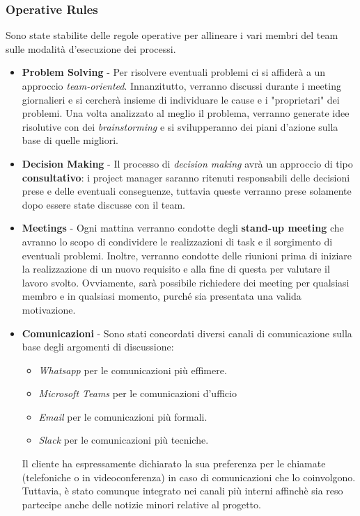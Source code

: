 \subsubsection{Operative Rules}
\label{sec:planning-operative-rules}
Sono state stabilite delle regole operative per allineare i vari membri del team sulle modalità d'esecuzione dei processi.
\begin{itemize}
    \item \textbf{Problem Solving} - Per risolvere eventuali problemi ci si affiderà a un approccio \textit{team-oriented}. Innanzitutto, verranno discussi durante i meeting giornalieri e si cercherà insieme di individuare le cause e i "proprietari" dei problemi. Una volta analizzato al meglio il problema, verranno generate idee risolutive con dei \textit{brainstorming} e si svilupperanno dei piani d'azione sulla base di quelle migliori.
    \item \textbf{Decision Making} - Il processo di \textit{decision making} avrà un approccio di tipo \textbf{consultativo}: i project manager saranno ritenuti responsabili delle decisioni prese e delle eventuali conseguenze, tuttavia queste verranno prese solamente dopo essere state discusse con il team.
    \item \textbf{Meetings} - Ogni mattina verranno condotte degli \textbf{stand-up meeting} che avranno lo scopo di condividere le realizzazioni di task e il sorgimento di eventuali problemi. Inoltre, verranno condotte delle riunioni prima di iniziare la realizzazione di un nuovo requisito e alla fine di questa per valutare il lavoro svolto. Ovviamente, sarà possibile richiedere dei meeting per qualsiasi membro e in qualsiasi momento, purché sia presentata una valida motivazione.
    \item \textbf{Comunicazioni} - Sono stati concordati diversi canali di comunicazione sulla base degli argomenti di discussione:
    \begin{itemize}
        \item \textit{Whatsapp} per le comunicazioni più effimere.
        \item \textit{Microsoft Teams} per le comunicazioni d'ufficio
        \item \textit{Email} per le comunicazioni più formali.
        \item \textit{Slack} per le comunicazioni più tecniche.
    \end{itemize}
    Il cliente ha espressamente dichiarato la sua preferenza per le chiamate (telefoniche o in videoconferenza) in caso di comunicazioni che lo coinvolgono. Tuttavia, è stato comunque integrato nei canali più interni affinchè sia reso partecipe anche delle notizie minori relative al progetto.
\end{itemize}

